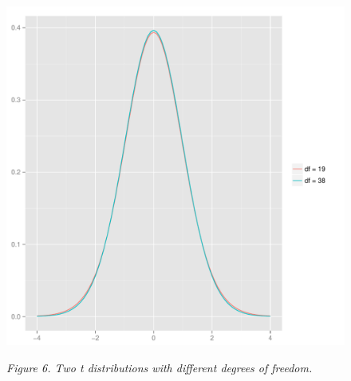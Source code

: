 \documentclass[man,a4paper,noextraspace,apacite]{apa6}\usepackage[]{graphicx}\usepackage[]{color}
\makeatletter
\def\maxwidth{ %
  \ifdim\Gin@nat@width>\linewidth
    \linewidth
  \else
    \Gin@nat@width
  \fi
}
\newenvironment{knitrout}{}{} %
\makeatother
\begin{document}
\begin{figure}  
\begin{knitrout}
\color{fgcolor}
\includegraphics[width=\maxwidth]{figure/tdist} 

\end{knitrout}
\textit{Figure 6. Two t distributions with different degrees of freedom.}
\end{figure}






\end{document}
